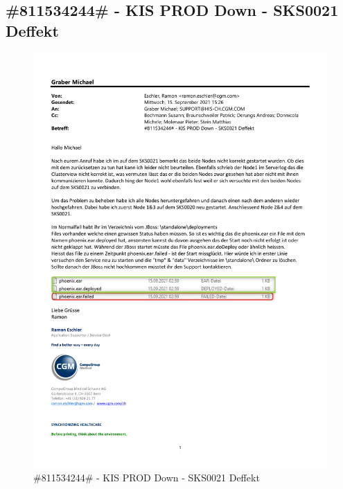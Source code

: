 
\subsection{\#811534244\# - KIS PROD Down - SKS0021 Deffekt}
\label{chap:811534244}
\begin{flushleft}
    \begin{figure}[H]
        \centering
        \includegraphics[width=1\linewidth]{source/appendix/jboss_deployments}
        \caption{\#811534244\# - KIS PROD Down - SKS0021 Deffekt}
        \label{fig:811534244}
    \end{figure}
\end{flushleft}